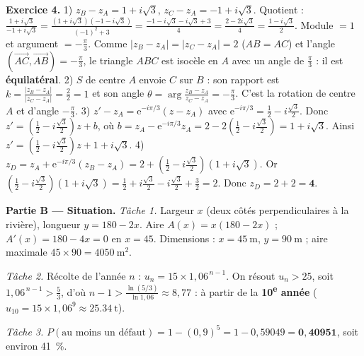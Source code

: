 \noindent\textbf{Exercice 4.}
1) $z_B-z_A=1+i\sqrt3$, $z_C-z_A=-1+i\sqrt3$. Quotient :
$\frac{1+i\sqrt3}{-1+i\sqrt3}=\frac{(1+i\sqrt3)(-1-i\sqrt3)}{(-1)^2+3}=\frac{-1-i\sqrt3-i\sqrt3+3}{4}=\frac{2-2i\sqrt3}{4}=\frac{1-i\sqrt3}{2}$.
Module $=1$ et argument $=-\frac\pi3$. Comme $|z_B-z_A|=|z_C-z_A|=2$ ($AB=AC$) et l'angle
$(\overrightarrow{AC},\overrightarrow{AB})=-\frac\pi3$, le triangle $ABC$ est isocèle en
$A$ avec un angle de $\frac\pi3$ : il est \textbf{équilatéral}.
2) $S$ de centre $A$ envoie $C$ sur $B$ : son rapport est $k=\frac{|z_B-z_A|}{|z_C-z_A|}=\frac22=1$
et son angle $\theta=\arg\frac{z_B-z_A}{z_C-z_A}=-\frac\pi3$. C'est la rotation de centre
$A$ et d'angle $-\frac\pi3$.
3) $z'-z_A=\mathrm e^{-i\pi/3}(z-z_A)$ avec $\mathrm e^{-i\pi/3}=\frac12-i\frac{\sqrt3}{2}$.
Donc $z'=\left(\frac12-i\frac{\sqrt3}{2}\right)z+b$, où $b=z_A-\mathrm e^{-i\pi/3}z_A=2-2\left(\frac12-i\frac{\sqrt3}{2}\right)=1+i\sqrt3$.
Ainsi $z'=\left(\frac12-i\frac{\sqrt3}{2}\right)z+1+i\sqrt3$.
4) $z_D=z_A+\mathrm e^{-i\pi/3}(z_B-z_A)=2+\left(\frac12-i\frac{\sqrt3}{2}\right)(1+i\sqrt3)$.
Or $\left(\frac12-i\frac{\sqrt3}{2}\right)(1+i\sqrt3)=\frac12+i\frac{\sqrt3}{2}-i\frac{\sqrt3}{2}+\frac{3}{2}=2$.
Donc $z_D=2+2=\mathbf{4}$.

\smallskip
\noindent\textbf{Partie B — Situation.}
\emph{Tâche 1.} Largeur $x$ (deux côtés perpendiculaires à la rivière), longueur
$y=180-2x$. Aire $A(x)=x(180-2x)$ ; $A'(x)=180-4x=0$ en $x=45$. Dimensions :
$x=\SI{45}{\metre}$, $y=\SI{90}{\metre}$ ; aire maximale $45\times90=\SI{4050}{\metre\squared}$.

\emph{Tâche 2.} Récolte de l'année $n$ : $u_n=15\times1{,}06^{\,n-1}$. On résout $u_n>25$,
soit $1{,}06^{\,n-1}>\frac53$, d'où $n-1>\frac{\ln(5/3)}{\ln1{,}06}\approx8{,}77$ : à partir
de la \textbf{10\textsuperscript{e} année} ($u_{10}=15\times1{,}06^9\approx\SI{25,34}{\tonne}$).

\emph{Tâche 3.} $P(\text{au moins un défaut})=1-(0{,}9)^5=1-0{,}59049=\mathbf{0{,}40951}$,
soit environ \SI{41}{\percent}.
